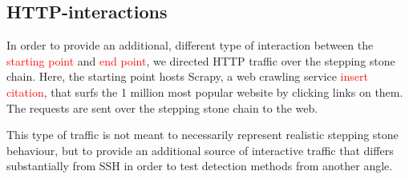 \documentclass[conference]{IEEEtran}\usepackage[]{graphicx}\usepackage[]{color}
\begin{document}


\subsection{HTTP-interactions}
 
In order to provide an additional, different type of interaction between the \textcolor{red}{starting point} and \textcolor{red}{end point}, we directed HTTP traffic over the stepping stone chain. Here, the starting point hosts Scrapy, a web crawling service \textcolor{red}{insert citation}, that surfs the 1 million most popular website by clicking links on them. The requests are sent over the stepping stone chain to the web. 

This type of traffic is not meant to necessarily represent realistic stepping stone behaviour, but to provide an additional source of interactive traffic that differs substantially from SSH in order to test detection methods from another angle.
\end{document}
